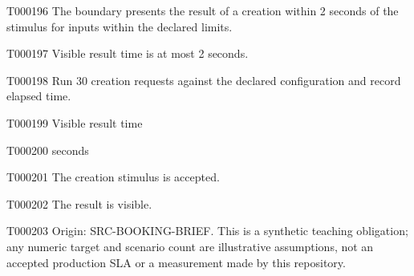 \documentclass[11pt,a4paper]{article}
\begin{document}
\begin{atlasparagraph}{T000196}
The boundary presents the result of a creation within 2 seconds of the stimulus for inputs within the declared limits.
\end{atlasparagraph}
\begin{atlasparagraph}{T000197}
Visible result time is at most 2 seconds.
\end{atlasparagraph}
\begin{atlasparagraph}{T000198}
Run 30 creation requests against the declared configuration and record elapsed time.
\end{atlasparagraph}
\begin{atlastext}{T000199}
Visible result time
\end{atlastext}
\begin{atlastext}{T000200}
seconds
\end{atlastext}
\begin{atlasparagraph}{T000201}
The creation stimulus is accepted.
\end{atlasparagraph}
\begin{atlasparagraph}{T000202}
The result is visible.
\end{atlasparagraph}
\begin{atlasparagraph}{T000203}
Origin: SRC-BOOKING-BRIEF. This is a synthetic teaching obligation; any numeric target and scenario count are illustrative assumptions, not an accepted production SLA or a measurement made by this repository.
\end{atlasparagraph}
\end{document}

